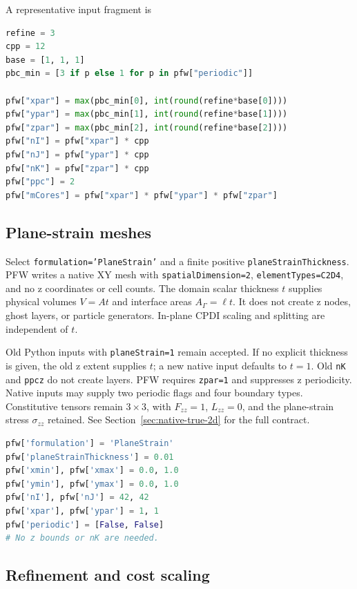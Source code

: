 A representative input fragment is
\begin{lstlisting}[language=Python,caption={Resolution variables used to populate PFW mesh controls.}]
refine = 3
cpp = 12
base = [1, 1, 1]
pbc_min = [3 if p else 1 for p in pfw["periodic"]]

pfw["xpar"] = max(pbc_min[0], int(round(refine*base[0])))
pfw["ypar"] = max(pbc_min[1], int(round(refine*base[1])))
pfw["zpar"] = max(pbc_min[2], int(round(refine*base[2])))
pfw["nI"] = pfw["xpar"] * cpp
pfw["nJ"] = pfw["ypar"] * cpp
pfw["nK"] = pfw["zpar"] * cpp
pfw["ppc"] = 2
pfw["mCores"] = pfw["xpar"] * pfw["ypar"] * pfw["zpar"]
\end{lstlisting}

\subsection{Plane-strain meshes}

Select \texttt{formulation='PlaneStrain'} and a finite positive
\texttt{planeStrainThickness}. PFW writes a native XY mesh with
\texttt{spatialDimension=2}, \texttt{elementTypes=C2D4}, and no z coordinates or
cell counts. The domain scalar thickness $t$ supplies physical volumes $V=At$
and interface areas $A_\Gamma=\ell t$. It does not create z nodes, ghost layers,
or particle generators. In-plane CPDI scaling and splitting are independent of $t$.

Old Python inputs with \texttt{planeStrain=1} remain accepted. If no explicit
thickness is given, the old z extent supplies $t$; a new native input defaults
to $t=1$. Old \texttt{nK} and \texttt{ppcz} do not create layers. PFW requires
\texttt{zpar=1} and suppresses z periodicity. Native inputs may supply two
periodic flags and four boundary types. Constitutive tensors remain $3\times3$,
with $F_{zz}=1$, $L_{zz}=0$, and the plane-strain stress $\sigma_{zz}$ retained.
See Section~\ref{sec:native-true-2d} for the full contract.

\begin{lstlisting}[language=Python,caption={Native XY plane strain.}]
pfw['formulation'] = 'PlaneStrain'
pfw['planeStrainThickness'] = 0.01
pfw['xmin'], pfw['xmax'] = 0.0, 1.0
pfw['ymin'], pfw['ymax'] = 0.0, 1.0
pfw['nI'], pfw['nJ'] = 42, 42
pfw['xpar'], pfw['ypar'] = 1, 1
pfw['periodic'] = [False, False]
# No z bounds or nK are needed.
\end{lstlisting}

\subsection{Refinement and cost scaling}


